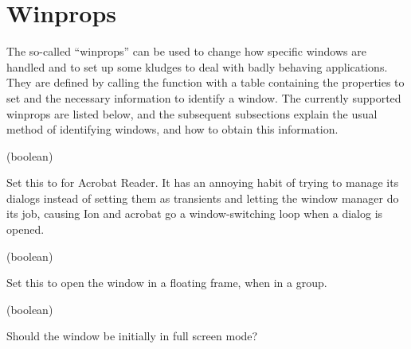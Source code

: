 \section{Winprops}
\label{sec:winprops}

The so-called ``winprops'' can be used to change how
specific windows are handled and to set up some kludges to deal with
badly behaving applications. They are defined by calling the function
 with a table containing the properties to set and the
necessary information to identify a window. The currently supported
winprops are listed below, and the subsequent subsections explain the
usual method of identifying windows, and how to obtain this information.


\newenvironment{winprop}[2]{
  \begin{function}%
      \item[Winprop:] \var{#1} (#2)
      \item[Description:]
}
{
  \end{function}
}


\begin{winprop}{acrobatic}{boolean}
    Set this to  for Acrobat Reader. It has an annoying
    habit of trying to manage its dialogs instead of setting them as
    transients and letting the window manager do its job, causing
    Ion and acrobat go a window-switching loop when a dialog is
    opened. 
\end{winprop}


\begin{winprop}{float}{boolean}
    Set this to open the window in a floating frame, when
    in a group.
\end{winprop}


\begin{winprop}{fullscreen}{boolean}
    Should the window be initially in full screen mode?
\end{winprop}


